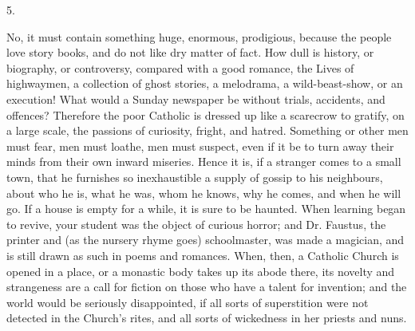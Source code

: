 5.

No, it must contain something huge, enormous,
prodigious, because the people love story books, and do
not like dry matter of fact. How dull is history, or
biography, or controversy, compared with a good romance,
the Lives of highwaymen, a collection of ghost stories, a
melodrama, a wild-beast-show, or an execution! What would
a Sunday newspaper be without trials, accidents, and
offences? Therefore the poor Catholic is dressed up like
a scarecrow to gratify, on a large scale, the passions of
curiosity, fright, and hatred. Something or other men
must fear, men must loathe, men must suspect, even if it
be to turn away their minds from their own inward
miseries. Hence it is, if a stranger comes to a small
town, that he furnishes so inexhaustible a supply of
gossip to his neighbours, about who he is, what he was,
whom he knows, why he comes, and when he will go. If a
house is empty for a while, it is sure to be haunted.
When learning began to revive, your student was the
object of curious horror; and Dr. Faustus, the printer
and (as the nursery rhyme goes) schoolmaster, was made a
magician, and is still drawn as such in poems and
romances. When, then, a Catholic Church is opened in a
place, or a monastic body takes up its abode there, its
novelty and strangeness are a call for fiction on those
who have a talent for invention; and the world would be
seriously disappointed, if all sorts of superstition were
not detected in the Church's rites, and all sorts of
wickedness in her priests and nuns.

